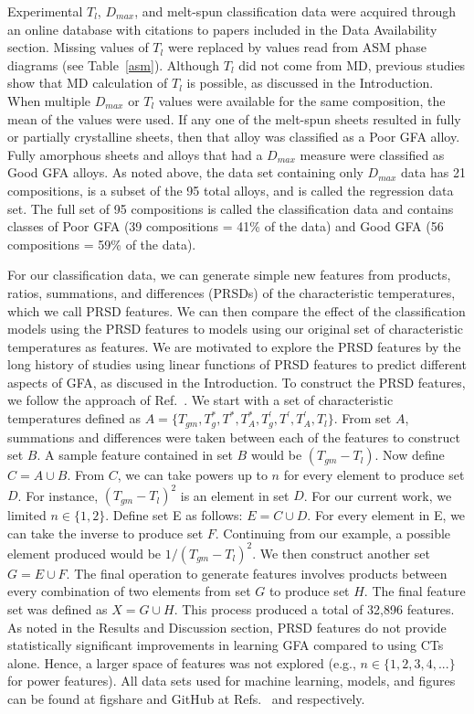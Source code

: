 \documentclass[11pt,a4paper]{article}                                %
\begin{document}
\par
Experimental $T_{l}$, $D_{max}$, and melt-spun classification data were acquired through an online database with citations to papers included in the Data Availability section. Missing values of $T_{l}$ were replaced by values read from ASM phase diagrams (see Table~\ref{asm}). Although $T_{l}$ did not come from MD, previous studies show that MD calculation of $T_{l}$ is possible, as discussed in the Introduction. When multiple $D_{max}$ or $T_{l}$ values were available for the same composition, the mean of the values were used. If any one of the melt-spun sheets resulted in fully or partially crystalline sheets, then that alloy was classified as a Poor GFA alloy. Fully amorphous sheets and alloys that had a $D_{max}$ measure were classified as Good GFA alloys. As noted above, the data set containing only $D_{max}$ data has 21 compositions, is a subset of the 95 total alloys, and is called the regression data set. The full set of 95 compositions is called the classification data and contains classes of Poor GFA (39 compositions = 41\% of the data) and Good GFA (56 compositions = 59\% of the data).

\par
For our classification data, we can generate simple new features from products, ratios, summations, and differences (PRSDs) of the characteristic temperatures, which we call PRSD features. We can then compare the effect of the classification models using the PRSD features to models using our original set of characteristic temperatures as features. We are motivated to explore the PRSD features by the long history of studies using linear functions of PRSD features to predict different aspects of GFA, as discused in the Introduction. To construct the PRSD features, we follow the approach of Ref.~\cite{SCHULTZ2021110494}. We start with a set of characteristic temperatures defined as $A=\{T_{gm}, T_{g}^{*}, T^{*}, T_{A}^{*}, T_{g}^{'}, T^{'}, T_{A}^{'}, T_{l}\}$. From set $A$, summations and differences were taken between each of the features to construct set $B$. A sample feature contained in set $B$ would be $(T_{gm}-T_{l})$. Now define $C=A \cup B$. From $C$, we can take powers up to $n$ for every element to produce set $D$. For instance, $(T_{gm}-T_{l})^{2}$ is an element in set $D$. For our current work, we limited $n \in \{1,2\}$. Define set E as follows: $E=C \cup D$. For every element in E, we can take the inverse to produce set $F$. Continuing from our example, a possible element produced would be $1/(T_{gm}-T_{l})^{2}$. We then construct another set $G=E \cup F$. The final operation to generate features involves products between every combination of two elements from set $G$ to produce set $H$. The final feature set was defined as $X=G \cup H$. This process produced a total of 32,896 features. As noted in the Results and Discussion section, PRSD features do not provide statistically significant improvements in learning GFA compared to using CTs alone. Hence, a larger space of features was not explored (e.g., $n \in \{1,2,3,4,...\}$ for power features). All data sets used for machine learning, models, and figures can be found at figshare and GitHub at Refs.~\cite{figshare_data} and \cite{github_data} respectively.
\end{document}
